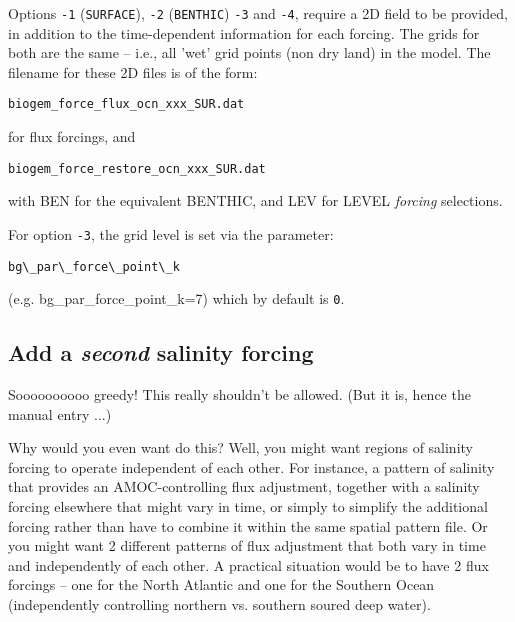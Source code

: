 \documentclass[11pt,fleqn]{book} %
\begin{document}
Options \texttt{-1} (\texttt{SURFACE}), \texttt{-2} (\texttt{BENTHIC}) \texttt{-3} and  \texttt{-4}, require a 2D field to be provided, in addition to the time-dependent information for each forcing. The grids for both are the same -- i.e., all 'wet' grid points (non dry land) in the model. The filename for these 2D files is of the form:
\vspace{-2pt}\small\begin{verbatim}
biogem_force_flux_ocn_xxx_SUR.dat
\end{verbatim}\normalsize\vspace{-2pt}
for flux forcings, and
\vspace{-2pt}\small\begin{verbatim}
biogem_force_restore_ocn_xxx_SUR.dat
\end{verbatim}\normalsize\vspace{-2pt}
with \textsf{\footnotesize BEN} for the equivalent BENTHIC, and \textsf{\footnotesize LEV} for LEVEL \textit{forcing} selections.

For option \texttt{-3}, the grid level is set via the parameter:
\vspace{-2pt}\small\begin{verbatim}
bg\_par\_force\_point\_k
\end{verbatim}\normalsize\vspace{-2pt}
(e.g. bg\_par\_force\_point\_k=7) which by default is \texttt{0}.

%
\newpage
\subsection*{Add a \textit{second} salinity forcing}
\vspace{1mm}

Soooooooooo greedy! This really shouldn't be allowed. (But it is, hence the manual entry ...)

Why would you even want do this? Well, you might want regions of salinity forcing to operate independent of each other. For instance, a pattern of salinity that provides an AMOC-controlling flux adjustment, together with a salinity forcing elsewhere that might vary in time, or simply to simplify the additional forcing rather than have to combine it within the same spatial pattern file. Or you might want 2 different patterns of flux adjustment that both vary in time and independently of each other. A practical situation would be to have 2 flux forcings -- one for the North Atlantic and one for the Southern Ocean (independently controlling northern vs. southern soured deep water).
\end{document}
